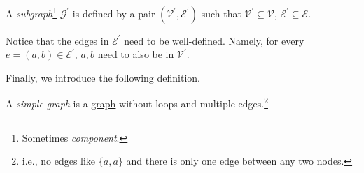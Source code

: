 \begin{definition}[Subgraph]\label{def:subgraph}
	A \emph{subgraph}\footnote{Sometimes \emph{component}.} \(\mathcal{G}^\prime\) is defined by a pair \((\mathcal{V}^\prime, \mathcal{E}^\prime)\) such that \(\mathcal{V}^\prime \subseteq \mathcal{V}\),
	\(\mathcal{E}^\prime\subseteq\mathcal{E}\).
\end{definition}

\begin{note}
	Notice that the edges in \(\mathcal{E}^\prime\) need to be well-defined. Namely, for every
	\(e = (a,b) \in\mathcal{E}^\prime\), \(a, b\) need to also be in \(\mathcal{V}^\prime\).
\end{note}

Finally, we introduce the following definition.
\begin{definition}\label{def:simple-graph}
	A \emph{simple graph} is a \hyperref[def:graph]{graph} without loops and multiple edges.\footnote{i.e., no edges like \(\{a, a\}\) and there is only one edge between any two nodes.}
\end{definition}